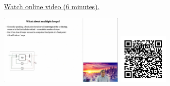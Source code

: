 
\begin{minipage}{10cm}
    \href{https://act4e-spring21.netlify.app/videos/spring2021-functorial-comp-b:solving-queries:multi-loop.html}{Watch online video (6 minutes).}
        
    \href{https://act4e-spring21.netlify.app/videos/spring2021-functorial-comp-b:solving-queries:multi-loop.html}{\includegraphics[height=3.5cm]{spring2021-functorial-comp-b:solving-queries:multi-loop/thumbnails.jpg}}
    \href{https://act4e-spring21.netlify.app/videos/spring2021-functorial-comp-b:solving-queries:multi-loop.html}{\includegraphics[height=2.5cm]{spring2021-functorial-comp-b:solving-queries:multi-loop/qrcode.png}}
\end{minipage}
